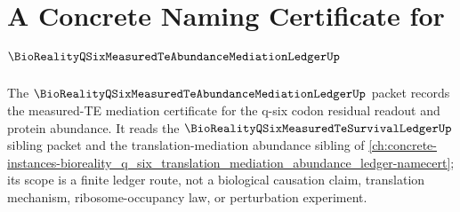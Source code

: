 \chapter{A Concrete Naming Certificate for $\BioRealityQSixMeasuredTeAbundanceMediationLedgerUp$}
\label{ch:concrete-instances-bioreality-q-six-measured-te-abundance-mediation-ledger-namecert}

The $\BioRealityQSixMeasuredTeAbundanceMediationLedgerUp$ packet records the measured-TE mediation certificate for the q-six codon residual readout and protein abundance. It reads the $\BioRealityQSixMeasuredTeSurvivalLedgerUp$ sibling packet and the translation-mediation abundance sibling of \autoref{ch:concrete-instances-bioreality_q_six_translation_mediation_abundance_ledger-namecert}; its scope is a finite ledger route, not a biological causation claim, translation mechanism, ribosome-occupancy law, or perturbation experiment.

